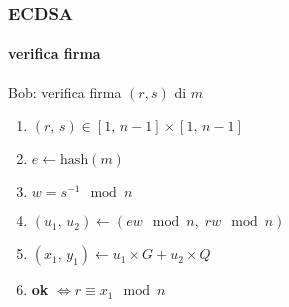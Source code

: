 \begin{frame}
\frametitle{ECDSA}
\framesubtitle{verifica firma}	

	{\color{blue}Bob}: verifica firma $(r,s)$ di $m$
	\begin{enumerate}
	  \item $(r,\,s)\in [1,\,n-1]\times[1,\,n-1]$
	  \item $e \leftarrow \mathrm{hash}(m)$  %
	  \item $w=s^{-1} \mod n$ 
	  \item $(u_1,\,u_2) \leftarrow (ew\mod n,\;rw \mod n)$
	  \item $(x_1,\,y_1) \leftarrow u_1 \times G + u_2 \times Q$
	  \item \textbf{ok} $\Leftrightarrow r \equiv x_1 \mod n$
	\end{enumerate}
\end{frame}
